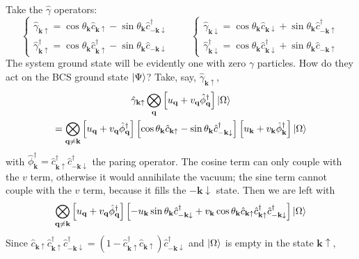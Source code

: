 Take the $\hat{\gamma}$ operators:
\[
	\begin{cases}
		\hat{\gamma}_{\mathbf{k}\uparrow} = \cos\theta_\mathbf{k} \hat{c}_{\mathbf{k}\uparrow} - \sin\theta_\mathbf{k} \hat{c}_{-\mathbf{k}\downarrow}^\dagger \\
		\hat{\gamma}_{\mathbf{k}\uparrow}^\dagger = \cos\theta_\mathbf{k} \hat{c}_{\mathbf{k}\uparrow}^\dagger - \sin\theta_\mathbf{k} \hat{c}_{-\mathbf{k}\downarrow}
	\end{cases}
	\qquad
	\begin{cases}
		\hat{\gamma}_{\mathbf{k}\downarrow} = \cos\theta_\mathbf{k} \hat{c}_{\mathbf{k}\downarrow} + \sin\theta_\mathbf{k} \hat{c}_{-\mathbf{k}\uparrow}^\dagger \\
		\hat{\gamma}_{\mathbf{k}\downarrow}^\dagger = \cos\theta_\mathbf{k} \hat{c}_{\mathbf{k}\downarrow}^\dagger + \sin\theta_\mathbf{k} \hat{c}_{-\mathbf{k}\uparrow}
	\end{cases}
\]
The system ground state will be evidently one with zero $\gamma$ particles.
How do they act on the BCS ground state $\ket{\Psi}$? Take, say, $\hat{\gamma}_{\mathbf{k}\uparrow}$,
\begin{multline*}
	\hat{\gamma}_{\mathbf{k}\uparrow} \bigotimes_\mathbf{q} \left[{u_\mathbf{q} + v_\mathbf{q} \hat{\phi}_\mathbf{q}^\dagger}\right] \ket{\Omega} \\ = \bigotimes_{\mathbf{q}\neq\mathbf{k}} \left[{u_\mathbf{q} + v_\mathbf{q} \hat{\phi}_\mathbf{q}^\dagger}\right] \left[{\cos\theta_\mathbf{k} \hat{c}_{\mathbf{k}\uparrow} - \sin\theta_\mathbf{k} \hat{c}_{-\mathbf{k}\downarrow}^\dagger}\right] \left[{u_\mathbf{k} + v_\mathbf{k} \hat{\phi}_\mathbf{k}^\dagger}\right] \ket{\Omega}
\end{multline*}
with $\hat{\phi}_\mathbf{k}^\dagger = \hat{c}_{\mathbf{k}\uparrow}^\dagger \hat{c}_{-\mathbf{k}\downarrow}^\dagger$ the paring operator. The cosine term can only couple with the $v$ term, otherwise it would annihilate the vacuum; the sine term cannot couple with the $v$ term, because it fills the $-\mathbf{k}\downarrow$ state. Then we are left with
\[
	\bigotimes_{\mathbf{q}\neq\mathbf{k}} \left[{u_\mathbf{q} + v_\mathbf{q} \hat{\phi}_\mathbf{q}^\dagger}\right] \left[{- u_\mathbf{k} \sin\theta_\mathbf{k} \hat{c}_{-\mathbf{k}\downarrow}^\dagger + v_\mathbf{k} \cos\theta_\mathbf{k} \hat{c}_{\mathbf{k}\uparrow} \hat{c}_{\mathbf{k}\uparrow}^\dagger \hat{c}_{-\mathbf{k}\downarrow}^\dagger}\right] \ket{\Omega}
\]
Since $\hat{c}_{\mathbf{k}\uparrow} \hat{c}_{\mathbf{k}\uparrow}^\dagger \hat{c}_{-\mathbf{k}\downarrow}^\dagger = (1 - \hat{c}_{\mathbf{k}\uparrow}^\dagger \hat{c}_{\mathbf{k}\uparrow}) \hat{c}_{-\mathbf{k}\downarrow}^\dagger$ and $\ket{\Omega}$ is empty in the state $\mathbf{k}\uparrow$,
